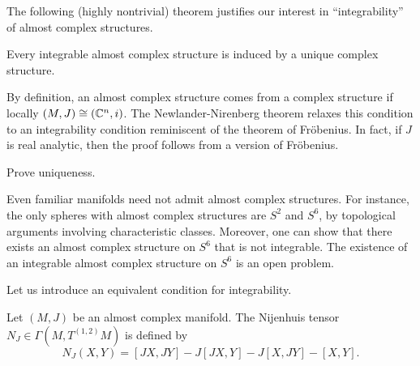 \documentclass{amsart}
\begin{document}
The following (highly nontrivial) theorem justifies our interest in ``integrability'' of almost complex structures.

\begin{theorem}
    Every integrable almost complex structure is induced by a unique complex structure.
    \label{theorem:nn}
\end{theorem}

By definition, an almost complex structure comes from a complex structure if locally $(M,J)\cong (\mathbb{C}^n,i)$. The
Newlander-Nirenberg theorem relaxes this condition to an integrability condition reminiscent of the theorem
of Fr\"obenius. In fact, if $J$ is real analytic, then the proof follows from a version of Fr\"obenius.

\begin{exercise}
    Prove uniqueness.
\end{exercise}

\begin{example}
    Even familiar manifolds need not admit almost complex structures. For instance, the only spheres with almost
    complex structures are $S^2$ and $S^6$, by topological arguments involving characteristic classes.
    Moreover, one can show that there exists an almost complex structure on $S^6$ that is not integrable.
    The existence of an integrable almost complex structure on $S^6$ is an open problem.
\end{example}


Let us introduce an equivalent condition for integrability.
\begin{definition}
    Let $(M,J)$ be an almost complex manifold. The {\color{blue}Nijenhuis tensor} $N_J\in\Gamma(M,T^{(1,2)}M)$
    is defined by
    \begin{equation*}
        N_J(X,Y) = [JX, JY] - J[JX, Y] - J[X,JY] - [X,Y].
    \end{equation*}
\end{definition}
\end{document}
